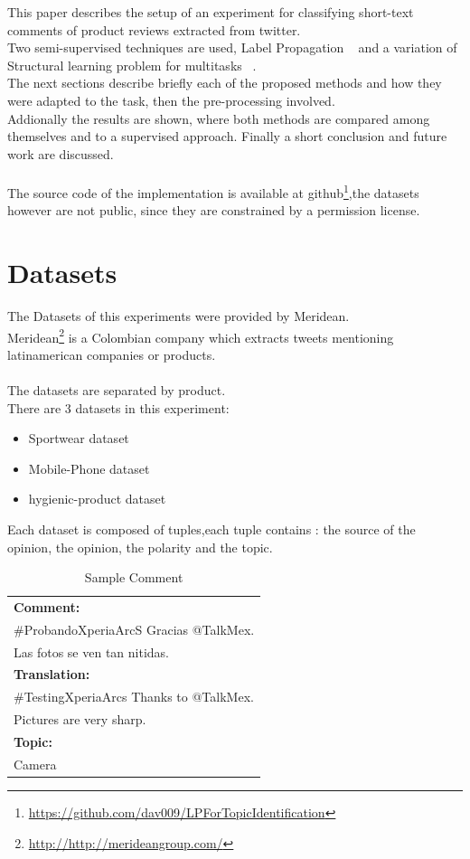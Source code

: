 \documentclass[4pt,a4paper,twocolumn]{article}
\begin{document}
This paper describes the setup of an experiment for classifying short-text comments of product reviews extracted from twitter.\\
Two semi-supervised techniques are used, Label Propagation ~\cite{Zhu:2005:SLG:1104523}  and  a variation of Structural learning problem for multitasks ~\cite{Ando:2005:FLP:1046920.1194905}.\\
The next sections describe briefly each of the proposed methods and how they were adapted to the task, then the pre-processing involved. \\
Addionally the results are shown, where both methods are compared among themselves and to a supervised approach.
Finally a short conclusion and future work are discussed.\\
\\
The source code of the implementation is available at github\footnote{\url{https://github.com/dav009/LPForTopicIdentification}},the datasets however are not public, since they are constrained by a permission license.

\section{Datasets}
The Datasets of this experiments were provided by Meridean.\\
Meridean\footnote{\url{http://http://merideangroup.com/}} is a Colombian company which extracts tweets
mentioning latinamerican companies or products.\\
\\
The datasets are separated by product.\\
There are 3 datasets in this experiment:
\begin{itemize}
	\item Sportwear dataset
	\item Mobile-Phone dataset
	\item hygienic-product dataset
\end{itemize}

Each dataset is composed of tuples,each tuple contains : the source of the opinion, the opinion, the polarity and the topic.\\

\begin{table}[h]
\centering
\begin{tabular}{| l |}
\hline
\textbf{Comment:}\\
$\#$ProbandoXperiaArcS Gracias @TalkMex.\\
Las fotos se ven tan nitidas.\\
\hline
\textbf{Translation:}\\
$\#$TestingXperiaArcs Thanks to @TalkMex.\\
Pictures are very sharp.\\
\hline
\textbf{Topic:}\\
Camera\\
\hline
\end{tabular}
\caption{Sample Comment}
\label{tab:sampleTuple}
\end{table}
\end{document}
